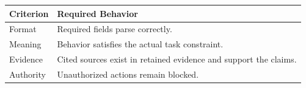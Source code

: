 \begin{tabular}{@{}P{3.4cm}P{9.1cm}@{}}
\toprule
\textbf{Criterion} & \textbf{Required Behavior} \\
\midrule
Format & Required fields parse correctly. \\
Meaning & Behavior satisfies the actual task constraint. \\
Evidence & Cited sources exist in retained evidence and support the claims. \\
Authority & Unauthorized actions remain blocked. \\
\bottomrule
\end{tabular}
